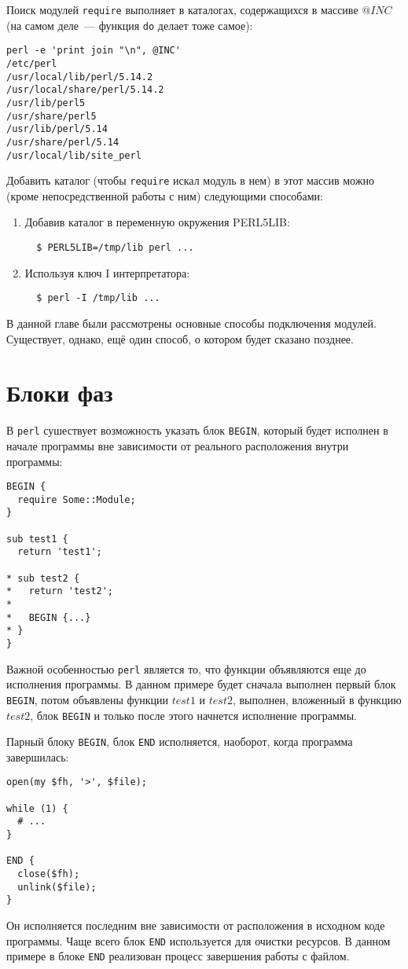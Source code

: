 Поиск модулей \verb|require| выполняет в каталогах, содержащихся в массиве $@INC$ (на самом деле~--- функция \verb|do| делает тоже самое):
\begin{verbatim}
perl -e 'print join "\n", @INC'
/etc/perl
/usr/local/lib/perl/5.14.2
/usr/local/share/perl/5.14.2
/usr/lib/perl5
/usr/share/perl5
/usr/lib/perl/5.14
/usr/share/perl/5.14
/usr/local/lib/site_perl
\end{verbatim}
Добавить каталог (чтобы \verb|require| искал модуль в нем) в этот массив можно (кроме непосредственной работы с ним) следующими способами:
\begin{enumerate}
	\item Добавив каталог в переменную окружения PERL5LIB:
  \begin{verbatim}
  $ PERL5LIB=/tmp/lib perl ...
  \end{verbatim}
	\item Используя ключ I интерпретатора:
  \begin{verbatim}
  $ perl -I /tmp/lib ...
  \end{verbatim}
\end{enumerate}
В данной главе были рассмотрены основные способы подключения модулей. Существует, однако, ещё один способ, о котором будет сказано позднее.

\section{Блоки фаз} %
В \verb|perl| сушествует возможность указать блок \verb|BEGIN|, который будет исполнен в начале программы вне зависимости от реального расположения внутри программы:
\begin{verbatim}
BEGIN {
  require Some::Module;
}

sub test1 {
  return 'test1';

* sub test2 {
*   return 'test2';
*
*   BEGIN {...}
* }
}
\end{verbatim}
Важной особенностью \verb|perl| является то, что функции объявляются еще до исполнения программы. В данном примере будет сначала выполнен первый блок \verb|BEGIN|, потом объявлены функции $test1$ и $test2$, выполнен, вложенный в функцию $test2$, блок \verb|BEGIN| и только после этого начнется исполнение программы.

Парный блоку \verb|BEGIN|, блок \verb|END| исполняется, наоборот, когда программа завершилась:
\begin{verbatim}
open(my $fh, '>', $file);

while (1) {
  # ...
}

END {
  close($fh);
  unlink($file);
}
\end{verbatim}
Он исполняется последним вне зависимости от расположения в исходном коде программы. Чаще всего блок \verb|END| используется для очистки ресурсов. В данном примере в блоке \verb|END| реализован процесс завершения работы с файлом.

